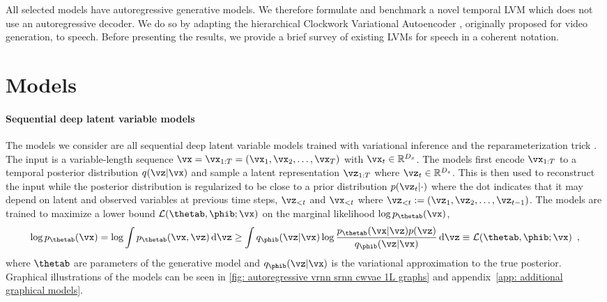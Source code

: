 {All selected models have autoregressive generative models. We therefore formulate and benchmark a novel temporal LVM which does not use an autoregressive decoder. We do so by adapting the hierarchical Clockwork Variational Autoencoder \parencite{saxena_clockwork_2021}, originally proposed for video generation, to speech.
Before presenting the results, we provide a brief survey of existing LVMs for speech in a coherent notation. 

\section{Models}
\paragraph{Sequential deep latent variable models}
The models we consider are all sequential deep latent variable models trained with variational inference and the reparameterization trick \parencite{kingma_autoencoding_2014}.
The input is a variable-length sequence $\vx = \vx_{1:T} = \left(\vx_1, \vx_2, \dots, \vx_{T}\right)$ with $\vx_t\in\mathbb{R}^{D_x}$. 
The models first encode $\vx_{1:T}$ to a temporal posterior distribution $q(\vz|\vx)$ and sample a latent representation $\vz_{1:T}$ where $\vz_t\in\mathbb{R}^{D_z}$. This is then used to reconstruct the input while the posterior distribution is regularized to be close to a prior distribution $p(\vz_t|\cdot)$ where the dot indicates that it may depend on latent and observed variables at previous time steps, $\vz_{<t}$ and $\vx_{<t}$ where $\vz_{<t} := \left( \vz_1, \vz_2, \dots, \vz_{t-1} \right)$. 
The models are trained to maximize a lower bound $\mathcal{L}(\thetab,\phib;\vx)$ on the marginal likelihood $\log p_\thetab(\vx)$,
\begin{equation}
    \log p_\thetab(\vx) = \log \int p_\thetab(\vx,\vz) \, \mathrm{d}\vz  \geq \int q_\phib(\vz|\vx) \log \frac{p_\thetab(\vx|\vz)p(\vz)}{q_\phib(\vz|\vx)}  \, \mathrm{d}\vz \equiv \mathcal{L}(\thetab,\phib;\vx)  \enspace , \label{eq: elbo}
\end{equation}
where $\thetab$ are parameters of the generative model and $q_\phib(\vz|\vx)$ is the variational approximation to the true posterior.
Graphical illustrations of the models can be seen in \cref{fig: autoregressive vrnn srnn cwvae 1L graphs} and appendix~\cref{app: additional graphical models}.

}
